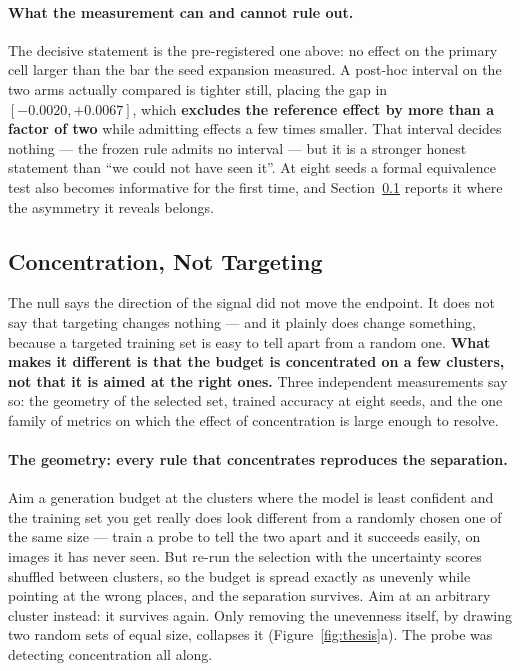 \documentclass{article} %
\begin{document}
\paragraph{What the measurement can and cannot rule out.} The decisive statement is the
pre-registered one above: no effect on the primary cell larger than the bar the seed expansion
measured. A post-hoc interval on the two arms actually compared is tighter still,
placing the gap in $[-0.0020, +0.0067]$, which \textbf{excludes the reference effect by more than a
factor of two} while admitting effects a few times smaller. That interval decides nothing --- the
frozen rule admits no interval --- but it is a stronger honest statement than ``we could not have
seen it''. At eight seeds a formal equivalence test also becomes informative for the first time, and
Section~\ref{sec:concentration} reports it where the asymmetry it reveals belongs.

\subsection{Concentration, Not Targeting}
\label{sec:concentration}
The null says the direction of the signal did not move the endpoint. It does not say that targeting
changes nothing --- and it plainly does change something, because a targeted training set is easy to
tell apart from a random one. \textbf{What makes it different is that the budget is concentrated on
a few clusters, not that it is aimed at the right ones.} Three independent measurements say so: the
geometry of the selected set, trained accuracy at eight seeds, and the one family of metrics on
which the effect of concentration is large enough to resolve.

\paragraph{The geometry: every rule that concentrates reproduces the separation.} Aim a generation
budget at the clusters where the model is least confident and the training set you get really does
look different from a randomly chosen one of the same size --- train a probe to tell the two apart
and it succeeds easily, on images it has never seen. But re-run the selection with the uncertainty
scores shuffled between clusters, so the budget is spread exactly as unevenly while pointing at the
wrong places, and the separation survives. Aim at an arbitrary cluster instead: it survives again.
Only removing the unevenness itself, by drawing two random sets of equal size, collapses it
(Figure~\ref{fig:thesis}a). The probe was detecting concentration all along.
\end{document}
